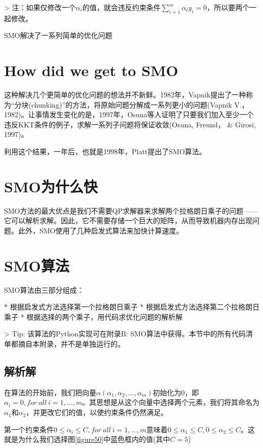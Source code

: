> 注：如果仅修改一个$\alpha_i$的值，就会违反约束条件$\sum\limits_{i=1}^m \alpha_i y_i = 0$，所以要两个一起修改。

SMO解决了一系列简单的优化问题

\section{How did we get to SMO}

这种解决几个更简单的优化问题的想法并不新鲜。1982年，Vapnik提出了一种称为“分块(chunking)”的方法，将原始问题分解成一系列更小的问题(Vapnik V.， 1982)。让事情发生变化的是，1997年，Osuna等人证明了只要我们加入至少一个违反KKT条件的例子，求解一系列子问题将保证收敛(Osuna, Freund， \& Girosi, 1997)。

利用这个结果，一年后，也就是1998年，Platt提出了SMO算法。

\section{SMO为什么快}

SMO方法的最大优点是我们不需要QP求解器来求解两个拉格朗日乘子的问题——它可以解析求解。因此，它不需要存储一个巨大的矩阵，从而导致机器内存出现问题。此外，SMO使用了几种启发式算法来加快计算速度。

\section{SMO算法 }

SMO算法由三部分组成：

* 根据启发式方法选择第一个拉格朗日乘子 
* 根据启发式方法选择第二个拉格朗日乘子 
* 根据选择的两个乘子，用代码求优化问题的解析解

> Tip: 该算法的Python实现可在附录B: SMO算法中获得。本节中的所有代码清单都摘自本附录，并不是单独运行的。

\subsection{解析解}

在算法的开始前，我们把向量$\alpha(\alpha_1,\alpha_2,\dots,\alpha_m)$初始化为0，即$\alpha_i=0,for\ all\ i=1,\dots,m$。其思想是从这个向量中选择两个元素，我们将其命名为$\alpha_1$和$\alpha_2$，并更改它们的值，以使约束条件仍然满足。

第一个约束条件$0 \leq \alpha_i \leq C ,for\ all\ i=1,\dots,m$意味着$0 \leq \alpha_1 \leq C,0 \leq \alpha_2 \leq C$。这就是为什么我们选择图\ref{figure50}中蓝色框内的值(其中$C=5$)

